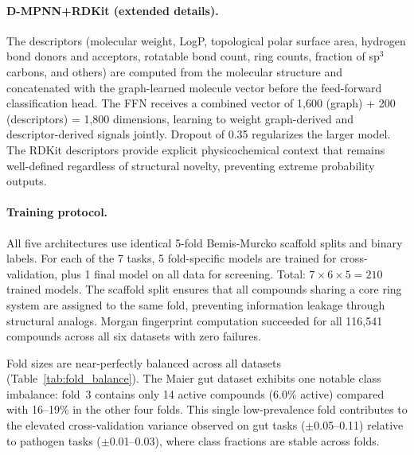 \documentclass{article}
\begin{document}
\paragraph{D-MPNN+RDKit (extended details).}
The descriptors (molecular weight, LogP, topological polar surface area, hydrogen bond donors and acceptors, rotatable bond count, ring counts, fraction of sp$^3$ carbons, and others) are computed from the molecular structure and concatenated with the graph-learned molecule vector before the feed-forward classification head.
The FFN receives a combined vector of 1,600 (graph) + 200 (descriptors) = 1,800 dimensions, learning to weight graph-derived and descriptor-derived signals jointly.
Dropout of 0.35 regularizes the larger model.
The RDKit descriptors provide explicit physicochemical context that remains well-defined regardless of structural novelty, preventing extreme probability outputs.

\paragraph{Training protocol.}
All five architectures use identical 5-fold Bemis-Murcko scaffold splits and binary labels.
For each of the 7 tasks, 5 fold-specific models are trained for cross-validation, plus 1 final model on all data for screening.
Total: $7 \times 6 \times 5 = 210$ trained models.
The scaffold split ensures that all compounds sharing a core ring system are assigned to the same fold, preventing information leakage through structural analogs.
Morgan fingerprint computation succeeded for all 116,541 compounds across all six datasets with zero failures.

Fold sizes are near-perfectly balanced across all datasets (Table~\ref{tab:fold_balance}).
The Maier gut dataset exhibits one notable class imbalance: fold~3 contains only 14 active compounds (6.0\% active) compared with 16--19\% in the other four folds.
This single low-prevalence fold contributes to the elevated cross-validation variance observed on gut tasks ($\pm$0.05--0.11) relative to pathogen tasks ($\pm$0.01--0.03), where class fractions are stable across folds.
\end{document}
